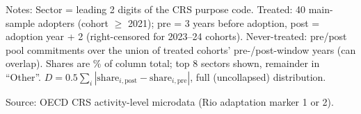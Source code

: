 \begin{table}[H]
\centering
\caption{Sector composition of adaptation-marked commitments, before vs.\ after NAP adoption}
\label{tab:remarking_sectors}
\begingroup\small
{}
\endgroup
\par\vspace{4pt}
\begin{minipage}{\linewidth}\footnotesize
Notes: Sector = leading 2 digits of the CRS purpose code. Treated: 40 main-sample adopters (cohort $\geq$ 2021); pre = 3 years before adoption, post = adoption year + 2 (right-censored for 2023--24 cohorts). Never-treated: pre/post pool commitments over the union of treated cohorts' pre-/post-window years (can overlap). Shares are \% of column total; top 8 sectors shown, remainder in ``Other''. $D = 0.5\sum_i|\text{share}_{i,\text{post}}-\text{share}_{i,\text{pre}}|$, full (uncollapsed) distribution.\par
Source: OECD CRS activity-level microdata (Rio adaptation marker 1 or 2).
\end{minipage}
\end{table}
